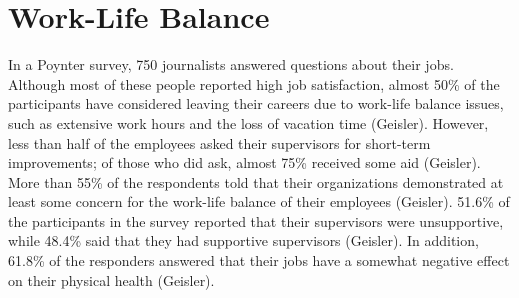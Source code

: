 \section{Work-Life Balance}
    In a Poynter survey, 750 journalists answered questions about their jobs. Although most of these people reported high job satisfaction, almost 50\% of the participants have considered leaving their careers due to work-life balance issues, such as extensive work hours and the loss of vacation time (Geisler). However, less than half of the employees asked their supervisors for short-term improvements; of those who did ask, almost 75\% received some aid (Geisler). More than 55\% of the respondents told that their organizations demonstrated at least some concern for the work-life balance of their employees (Geisler). 51.6\% of the participants in the survey reported that their supervisors were unsupportive, while 48.4\% said that they had supportive supervisors (Geisler). In addition, 61.8\% of the responders answered that their jobs have a somewhat negative effect on their physical health (Geisler). 
